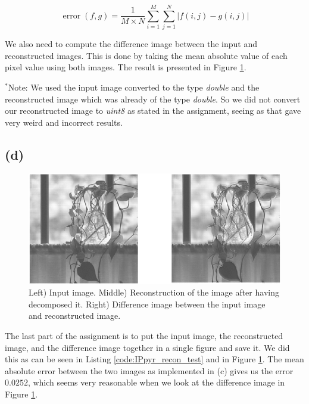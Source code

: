 \documentclass{article}
\begin{document}
\begin{equation}\label{eq:meanabserror}
    \operatorname{error}(f, g)=\frac{1}{M \times N} \sum_{i=1}^{M} \sum_{j=1}^{N}|f(i, j)-g(i, j)|
\end{equation}

We also need to compute the difference image between the input and reconstructed images. This is done by taking the mean absolute value of each pixel value using both images. The result is presented in Figure \ref{fig:recon_all}.

$^*$Note: We used the input image converted to the type \textit{double} and the reconstructed image which was already of the type \textit{double}. So we did not convert our reconstructed image to \textit{uint8} as stated in the assignment, seeing as that gave very weird and incorrect results.

\subsection*{(d)}

\begin{figure}[h]
    \centering
    \includegraphics[width=\textwidth]{Assignment_3/output_plots/IPpyr_recon_test_partial.png}
    \caption{Left) Input image. Middle) Reconstruction of the image after having decomposed it. Right) Difference image between the input image and reconstructed image.}
    \label{fig:recon_all}
\end{figure}
The last part of the assignment is to put the input image, the reconstructed image, and the difference image together in a single figure and save it. We did this as can be seen in  Listing \ref{code:IPpyr_recon_test} and in Figure \ref{fig:recon_all}. The mean absolute error between the two images as implemented in (c) gives us the error $0.0252$, which seems very reasonable when we look at the difference image in Figure \ref{fig:recon_all}.

\newpage

\typeout{}

\end{document}
